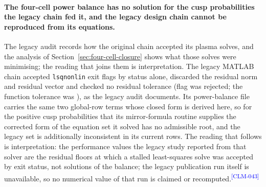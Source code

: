 \documentclass[11pt]{article}
\newcommand{\EvidenceClaim}[2]{#2\textsuperscript{\textcolor{blue}{[#1]}}}
\begin{document}
\paragraph{The four-cell power balance has no solution for the cusp
probabilities the legacy chain fed it, and the legacy design chain cannot be
reproduced from its equations.}
The legacy audit records how the original chain accepted its plasma solves, and
the analysis of Section~\ref{sec:four-cell-closure} shows what those solves were
minimising; the reading that joins them is interpretation.
\EvidenceClaim{CLM-043}{The legacy MATLAB chain accepted \texttt{lsqnonlin} exit
flags \FccAuditAcceptedFlags{} by status alone, discarded the residual norm and
residual vector and checked no residual tolerance (flag \FccAuditRejectedFlag{}
was rejected; the function tolerance was \FccAuditTolFun), as the legacy audit
documents. Its power-balance file carries
the same two global-row terms whose closed form is derived here, so for the
positive cusp probabilities that its mirror-formula routine supplies the
corrected form of the equation set it solved has no admissible root, and the
legacy set is additionally inconsistent in its current rows. The reading that
follows is interpretation: the performance values the legacy study reported from
that solver are the residual floors at which a stalled least-squares solve was
accepted by exit status, not solutions of the balance; the legacy publication
run itself is unavailable, so no numerical value of that run is claimed or
recomputed.}
\end{document}
